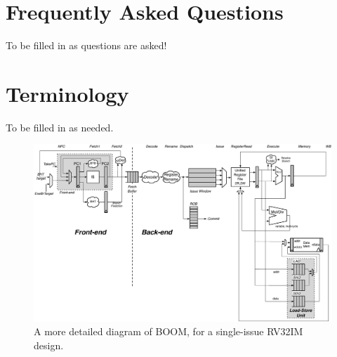 \documentclass[11pt, notitlepage]{report}
\begin{document}
\appendix



\chapter{Frequently Asked Questions}

To be filled in as questions are asked!


\chapter{Terminology}

To be filled in as needed.



\begin{figure}[ht]
	\centering
	\centerline{\includegraphics[scale =.9, angle=90] {figures/simple_boom_pipeline}}
	\caption{ \small A more detailed diagram of BOOM, for a single-issue RV32IM design.}
	\label{fig:boom-detailed}
\end{figure}








\end{document}

